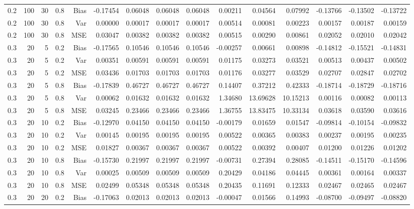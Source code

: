 \begin{table}[!htbp]
\begin{tabular}{lrrrrrrrrrrrrrr}
0.2 & 100 & 30 & 0.8 & Bias & -0.17454 & 0.06048 & 0.06048 & 0.06048 & 0.00211 & 0.04564 & 0.07992 & -0.13766 & -0.13502 & -0.13722 \\
0.2 & 100 & 30 & 0.8 & Var & 0.00000 & 0.00017 & 0.00017 & 0.00017 & 0.00514 & 0.00081 & 0.00223 & 0.00157 & 0.00187 & 0.00159 \\
0.2 & 100 & 30 & 0.8 & MSE & 0.03047 & 0.00382 & 0.00382 & 0.00382 & 0.00515 & 0.00290 & 0.00861 & 0.02052 & 0.02010 & 0.02042 \\
0.3 &  20 &  5 & 0.2 & Bias & -0.17565 & 0.10546 & 0.10546 & 0.10546 & -0.00257 & 0.00661 & 0.00898 & -0.14812 & -0.15521 & -0.14831 \\
0.3 &  20 &  5 & 0.2 & Var & 0.00351 & 0.00591 & 0.00591 & 0.00591 & 0.01175 & 0.03273 & 0.03521 & 0.00513 & 0.00437 & 0.00502 \\
0.3 &  20 &  5 & 0.2 & MSE & 0.03436 & 0.01703 & 0.01703 & 0.01703 & 0.01176 & 0.03277 & 0.03529 & 0.02707 & 0.02847 & 0.02702 \\
0.3 &  20 &  5 & 0.8 & Bias & -0.17839 & 0.46727 & 0.46727 & 0.46727 & 0.14407 & 0.37212 & 0.42333 & -0.18714 & -0.18729 & -0.18716 \\
0.3 &  20 &  5 & 0.8 & Var & 0.00062 & 0.01632 & 0.01632 & 0.01632 & 1.34680 & 13.69628 & 10.15213 & 0.00116 & 0.00082 & 0.00113 \\
0.3 &  20 &  5 & 0.8 & MSE & 0.03245 & 0.23466 & 0.23466 & 0.23466 & 1.36755 & 13.83475 & 10.33134 & 0.03618 & 0.03590 & 0.03616 \\
0.3 &  20 & 10 & 0.2 & Bias & -0.12970 & 0.04150 & 0.04150 & 0.04150 & -0.00179 & 0.01659 & 0.01547 & -0.09814 & -0.10154 & -0.09832 \\
0.3 &  20 & 10 & 0.2 & Var & 0.00145 & 0.00195 & 0.00195 & 0.00195 & 0.00522 & 0.00365 & 0.00383 & 0.00237 & 0.00195 & 0.00235 \\
0.3 &  20 & 10 & 0.2 & MSE & 0.01827 & 0.00367 & 0.00367 & 0.00367 & 0.00522 & 0.00392 & 0.00407 & 0.01200 & 0.01226 & 0.01202 \\
0.3 &  20 & 10 & 0.8 & Bias & -0.15730 & 0.21997 & 0.21997 & 0.21997 & -0.00731 & 0.27394 & 0.28085 & -0.14511 & -0.15170 & -0.14596 \\
0.3 &  20 & 10 & 0.8 & Var & 0.00025 & 0.00509 & 0.00509 & 0.00509 & 0.20429 & 0.04186 & 0.04445 & 0.00361 & 0.00164 & 0.00337 \\
0.3 &  20 & 10 & 0.8 & MSE & 0.02499 & 0.05348 & 0.05348 & 0.05348 & 0.20435 & 0.11691 & 0.12333 & 0.02467 & 0.02465 & 0.02467 \\
0.3 &  20 & 20 & 0.2 & Bias & -0.17063 & 0.02013 & 0.02013 & 0.02013 & -0.00047 & 0.01566 & 0.14993 & -0.08700 & -0.09497 & -0.08820 \\

\end{tabular}
\end{table}
